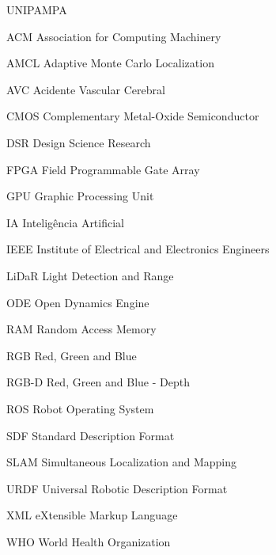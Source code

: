 \documentclass[tcc,baec,oneside]{unipampa}
\begin{document}
%
\begin{listofabbrv}{UNIPAMPA}
        \item[ACM] Association for Computing Machinery
       \item[AMCL]  Adaptive Monte Carlo Localization
        \item[AVC]     Acidente Vascular Cerebral
        \item[CMOS]    Complementary Metal-Oxide Semiconductor
        \item[DSR]      Design Science Research
        \item[FPGA]    Field Programmable Gate Array
        \item[GPU]     Graphic Processing Unit
        \item[IA]      Inteligência Artificial
        \item[IEEE] Institute of Electrical and Electronics Engineers 
        \item[LiDaR]   Light Detection and Range
        \item[ODE]     Open Dynamics Engine
        \item[RAM]      Random Access Memory
        \item[RGB]   Red, Green and Blue
        \item[RGB-D]   Red, Green and Blue - Depth
        \item[ROS]     Robot Operating System
        \item[SDF]      Standard Description Format
        \item[SLAM]    Simultaneous Localization and Mapping
        \item[URDF]    Universal Robotic Description Format
        \item[XML]      eXtensible Markup Language 
        \item[WHO]     World Health Organization
\end{listofabbrv}


% 
%
\end{document}
